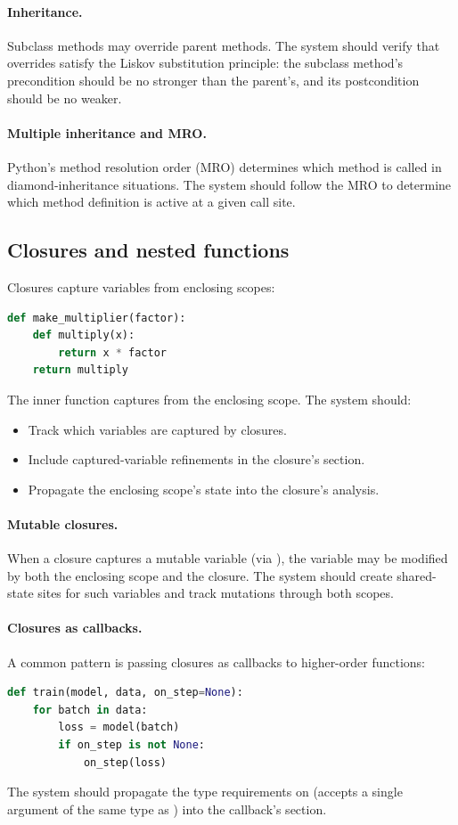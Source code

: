 \documentclass[11pt]{report}
\DeclareRobustCommand{\py}[1]{\texttt{\detokenize{#1}}}
\theoremstyle{definition}
\theoremstyle{plain}
\begin{document}
\paragraph{Inheritance.}
Subclass methods may override parent methods. The system should verify that
overrides satisfy the Liskov substitution principle: the subclass method's
precondition should be no stronger than the parent's, and its postcondition
should be no weaker.

\paragraph{Multiple inheritance and MRO.}
Python's method resolution order (MRO) determines which method is called in
diamond-inheritance situations. The system should follow the MRO to determine
which method definition is active at a given call site.

\subsection{Closures and nested functions}

Closures capture variables from enclosing scopes:
\begin{lstlisting}[style=deppy,language=Python]
def make_multiplier(factor):
    def multiply(x):
        return x * factor
    return multiply
\end{lstlisting}
The inner function \py{multiply} captures \py{factor} from the enclosing
scope. The system should:
\begin{itemize}[nosep]
  \item Track which variables are captured by closures.
  \item Include captured-variable refinements in the closure's section.
  \item Propagate the enclosing scope's state into the closure's analysis.
\end{itemize}

\paragraph{Mutable closures.}
When a closure captures a mutable variable (via \py{nonlocal}), the variable
may be modified by both the enclosing scope and the closure. The system should
create shared-state sites for such variables and track mutations through both
scopes.

\paragraph{Closures as callbacks.}
A common pattern is passing closures as callbacks to higher-order functions:
\begin{lstlisting}[style=deppy,language=Python]
def train(model, data, on_step=None):
    for batch in data:
        loss = model(batch)
        if on_step is not None:
            on_step(loss)
\end{lstlisting}
The system should propagate the type requirements on \py{on_step} (accepts a
single argument of the same type as \py{loss}) into the callback's section.
\end{document}
